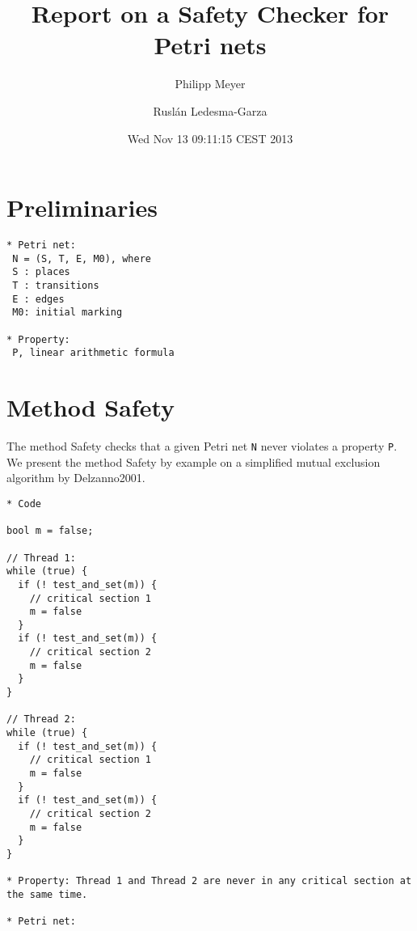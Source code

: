 \documentclass{article}
\begin{document}
\title{Report on a Safety Checker for Petri nets}
\author{Philipp Meyer \and Rusl\'{a}n Ledesma-Garza}
\date{Wed Nov 13 09:11:15 CEST 2013}



\section{Preliminaries}


\begin{verbatim}
* Petri net:
 N = (S, T, E, M0), where
 S : places
 T : transitions
 E : edges
 M0: initial marking

* Property:
 P, linear arithmetic formula
\end{verbatim}
\iffalse
\begin{verbatim}
 Examples:
  x + y < 0
  x + y < 0 \\and x + z > 0
  x + y < 0 \\or  x + z > 0

 ~P = (x + y <  0 \\and x + z >  0) \\or  x + z >  0
  P = (x + y >= 0 \\or  x + z <= 0) \\and x + z <= 0
\end{verbatim}
\fi

\newpage
\section{Method Safety}

The method Safety checks that a given Petri net \verb=N= never violates a property \verb=P=.
We present the method Safety by example on a simplified mutual exclusion algorithm by Delzanno2001.

\begin{verbatim}
* Code

bool m = false;

// Thread 1:
while (true) {
  if (! test_and_set(m)) {
    // critical section 1
    m = false
  }
  if (! test_and_set(m)) {
    // critical section 2
    m = false
  }
}

// Thread 2:
while (true) {
  if (! test_and_set(m)) {
    // critical section 1
    m = false
  }
  if (! test_and_set(m)) {
    // critical section 2
    m = false
  }
}

* Property: Thread 1 and Thread 2 are never in any critical section at the same time.

* Petri net:

\end{verbatim}
\end{document}
